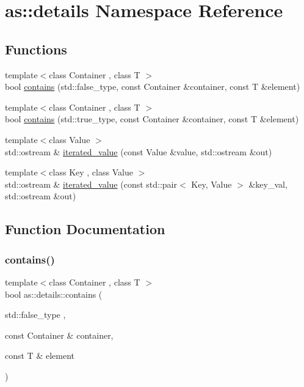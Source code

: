 \hypertarget{namespaceas_1_1details}{}\section{as\+:\+:details Namespace Reference}
\label{namespaceas_1_1details}
\subsection*{Functions}
\begin{DoxyCompactItemize}
\item 
{\footnotesize template$<$class Container , class T $>$ }\\bool \hyperlink{namespaceas_1_1details_aaa1e2c1c370bddd0020956d333bbef26}{contains} (std\+::false\+\_\+type, const Container \&container, const T \&element)
\item 
{\footnotesize template$<$class Container , class T $>$ }\\bool \hyperlink{namespaceas_1_1details_aa25b4a9ab19e3b807bbd58dc208d2607}{contains} (std\+::true\+\_\+type, const Container \&container, const T \&element)
\item 
{\footnotesize template$<$class Value $>$ }\\std\+::ostream \& \hyperlink{namespaceas_1_1details_a2e51ab78c6720ab244aa4cd08c5e7b55}{iterated\+\_\+value} (const Value \&value, std\+::ostream \&out)
\item 
{\footnotesize template$<$class Key , class Value $>$ }\\std\+::ostream \& \hyperlink{namespaceas_1_1details_abb914e2826b38ed8ae4d2f8004843689}{iterated\+\_\+value} (const std\+::pair$<$ Key, Value $>$ \&key\+\_\+val, std\+::ostream \&out)
\end{DoxyCompactItemize}


\subsection{Function Documentation}
\mbox{\label{namespaceas_1_1details_aaa1e2c1c370bddd0020956d333bbef26}} 
\subsubsection{\texorpdfstring{contains()}{contains()}\hspace{0.1cm}{\footnotesize\ttfamily [1/2]}}
{\footnotesize\ttfamily template$<$class Container , class T $>$ \\
bool as\+::details\+::contains (\begin{DoxyParamCaption}\item[{std\+::false\+\_\+type}]{,  }\item[{const Container \&}]{container,  }\item[{const T \&}]{element }\end{DoxyParamCaption})}

